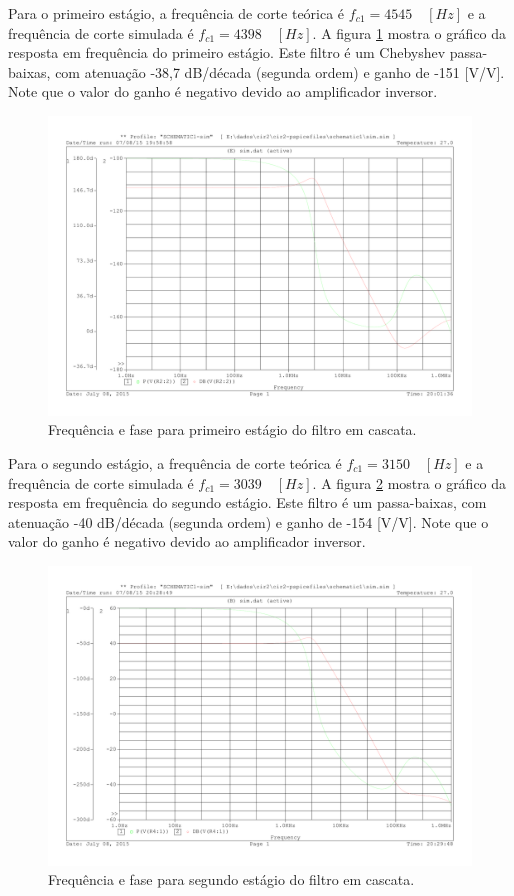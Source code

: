 Para o primeiro estágio, a frequência de corte teórica é $f_{c1} = 4545 \quad [Hz]$ e a frequência de corte simulada é $f_{c1} = 4398 \quad [Hz]$. A figura \ref{f_bode2} mostra o gráfico da resposta em frequência do primeiro estágio. Este filtro é um Chebyshev passa-baixas, com atenuação -38,7 dB/década (segunda ordem) e ganho de -151 [V/V].
Note que o valor do ganho é negativo devido ao amplificador inversor.

\begin{figure}[H]
\centering
\includegraphics[scale=0.5]{Imagens/bode2.pdf}
\caption{Frequência e fase para primeiro estágio do filtro em cascata.}
\label{f_bode2}
\end{figure}


Para o segundo estágio, a frequência de corte teórica é $f_{c1} = 3150 \quad [Hz]$ e a frequência de corte simulada é $f_{c1} = 3039 \quad [Hz]$. A figura \ref{f_bode3} mostra o gráfico da resposta em frequência do segundo estágio. Este filtro é um passa-baixas, com atenuação -40 dB/década (segunda ordem) e ganho de -154 [V/V].
Note que o valor do ganho é negativo devido ao amplificador inversor.

\begin{figure}[H]
\centering
\includegraphics[scale=0.5]{Imagens/bode3.pdf}
\caption{Frequência e fase para segundo estágio do filtro em cascata.}
\label{f_bode3}
\end{figure}

